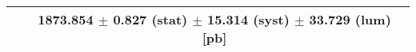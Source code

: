 \begin{tabular}{lc}
\hline
                               & 1873.854 $\pm$ 0.827 (stat) $\pm$ 15.314 (syst) $\pm$ 33.729 (lum) [pb]  \\
\hline
\end{tabular}
